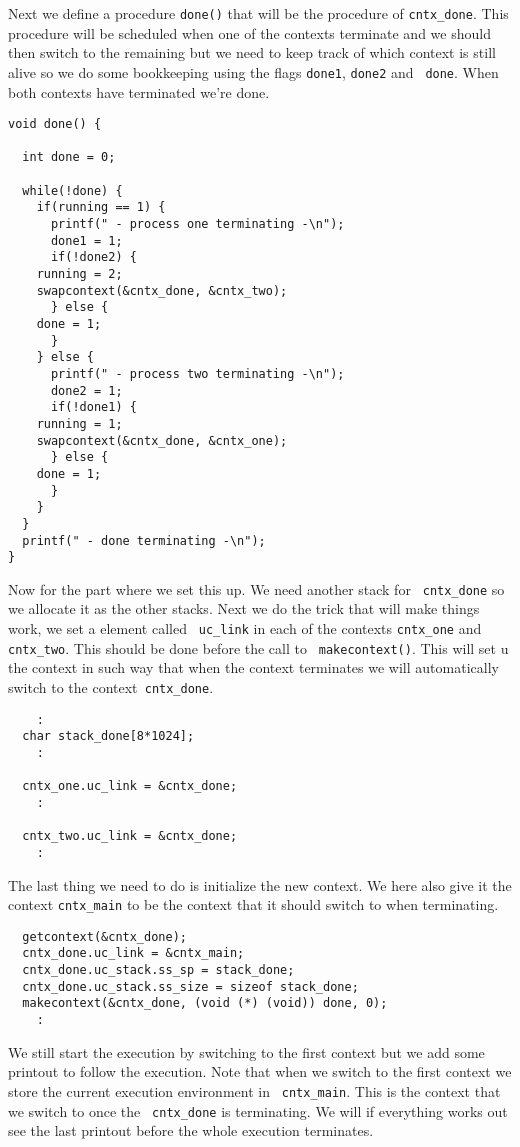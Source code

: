 \documentclass[a4paper,11pt]{article}
\begin{document}
Next we define a procedure {\tt done()} that will be the procedure of
{\tt cntx\_done}. This procedure will be scheduled when one of the
contexts terminate and we should then switch to the remaining but we
need to keep track of which context is still alive so we do some
bookkeeping using the flags {\tt done1}, {\tt done2} and {\tt
  done}. When both contexts have terminated we're done.

\begin{lstlisting}
void done() {

  int done = 0;

  while(!done) {
    if(running == 1) {
      printf(" - process one terminating -\n");
      done1 = 1;
      if(!done2) {
	running = 2;
	swapcontext(&cntx_done, &cntx_two);
      } else {
	done = 1;
      }
    } else {
      printf(" - process two terminating -\n");
      done2 = 1;
      if(!done1) {
	running = 1;
	swapcontext(&cntx_done, &cntx_one);
      } else {
	done = 1;
      }
    }
  }
  printf(" - done terminating -\n");
}
\end{lstlisting}

Now for the part where we set this up. We need another stack for {\tt
  cntx\_done} so we allocate it as the other stacks. Next we do the
trick that will make things work, we set a element called {\tt
  uc\_link} in each of the contexts {\tt cntx\_one} and {\tt
  cntx\_two}. This should be done before the call to {\tt
  makecontext()}. This will set u the context in such way that when
the context terminates we will automatically switch to the context{\tt
  cntx\_done}.
\begin{lstlisting}
    :
  char stack_done[8*1024];
    :

  cntx_one.uc_link = &cntx_done;
    :

  cntx_two.uc_link = &cntx_done;
    :
\end{lstlisting}

The last thing we need to do is initialize the new context. We here
also give it the context {\tt cntx\_main} to be the context that it
should switch to when terminating.

\begin{lstlisting}
  getcontext(&cntx_done);
  cntx_done.uc_link = &cntx_main;
  cntx_done.uc_stack.ss_sp = stack_done;
  cntx_done.uc_stack.ss_size = sizeof stack_done;
  makecontext(&cntx_done, (void (*) (void)) done, 0);  
    :  
\end{lstlisting}

We still start the execution by switching to the first context but we
add some printout to follow the execution. Note that when we switch to
the first context we store the current execution environment in {\tt
  cntx\_main}. This is the context that we switch to once the {\tt
  cntx\_done} is terminating. We will if everything works out see the
last printout before the whole execution terminates.
\end{document}

